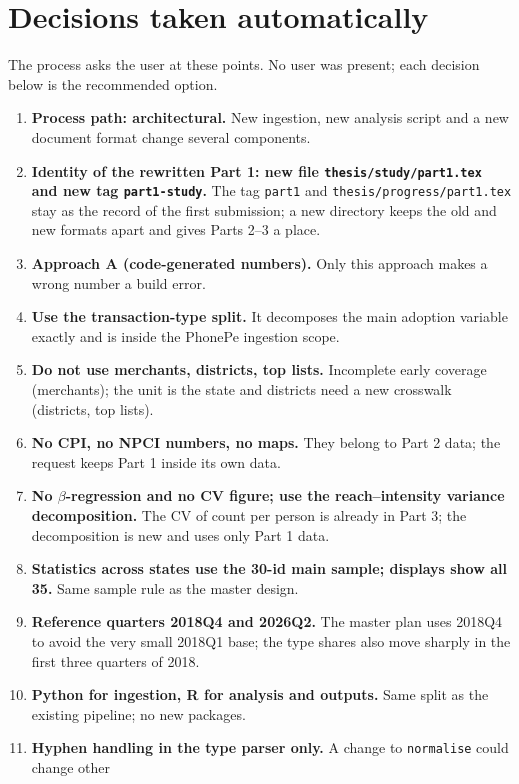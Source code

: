 \documentclass[11pt,a4paper]{article}
\newcommand{\f}[1]{\texttt{#1}}
\begin{document}
\section{Decisions taken automatically}
The process asks the user at these points. No user was present; each decision below is the
recommended option.

\begin{enumerate}
  \item \textbf{Process path: architectural.} New ingestion, new analysis script and a new document
        format change several components.
  \item \textbf{Identity of the rewritten Part 1: new file \f{thesis/study/part1.tex} and new tag
        \f{part1-study}.} The tag \f{part1} and \f{thesis/progress/part1.tex} stay as the record of the
        first submission; a new directory keeps the old and new formats apart and gives Parts 2--3 a
        place.
  \item \textbf{Approach A (code-generated numbers).} Only this approach makes a wrong number a build
        error.
  \item \textbf{Use the transaction-type split.} It decomposes the main adoption variable exactly and
        is inside the PhonePe ingestion scope.
  \item \textbf{Do not use merchants, districts, top lists.} Incomplete early coverage (merchants);
        the unit is the state and districts need a new crosswalk (districts, top lists).
  \item \textbf{No CPI, no NPCI numbers, no maps.} They belong to Part 2 data; the request keeps
        Part 1 inside its own data.
  \item \textbf{No $\beta$-regression and no CV figure; use the reach--intensity variance
        decomposition.} The CV of count per person is already in Part 3; the decomposition is new and
        uses only Part 1 data.
  \item \textbf{Statistics across states use the 30-id main sample; displays show all 35.} Same
        sample rule as the master design.
  \item \textbf{Reference quarters 2018Q4 and 2026Q2.} The master plan uses 2018Q4 to avoid the very
        small 2018Q1 base; the type shares also move sharply in the first three quarters of 2018.
  \item \textbf{Python for ingestion, R for analysis and outputs.} Same split as the existing
        pipeline; no new packages.
  \item \textbf{Hyphen handling in the type parser only.} A change to \f{normalise} could change other

\end{enumerate}
\end{document}
